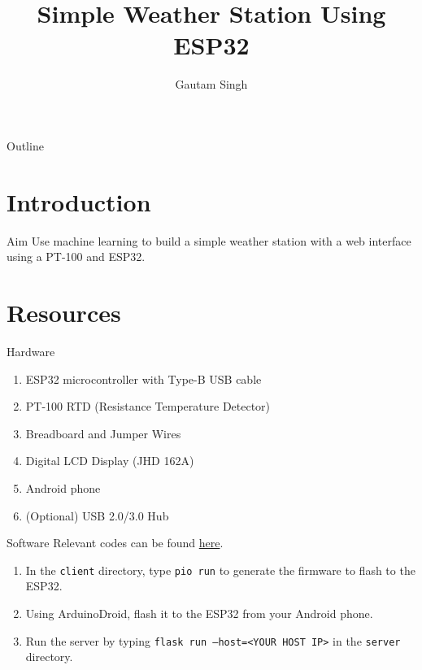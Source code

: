 \documentclass{beamer}
\title[ESP32 Weather Station]{Simple Weather Station Using ESP32}
\author{Gautam Singh}
\theoremstyle{remark}
\begin{document}
\begin{frame}
    \titlepage 
\end{frame}

\logo{}

\begin{frame}{Outline}
    \tableofcontents
\end{frame}

\section{Introduction}
\begin{frame}{Aim}
    Use machine learning to build a simple weather station with a web interface
    using a PT-100 and ESP32.
\end{frame}

\section{Resources}
\begin{frame}{Hardware}
    \begin{enumerate}
        \item ESP32 microcontroller with Type-B USB cable
        \item PT-100 RTD (Resistance Temperature Detector)
        \item Breadboard and Jumper Wires
        \item Digital LCD Display (JHD 162A)
        \item Android phone
        \item (Optional) USB 2.0/3.0 Hub
    \end{enumerate}
\end{frame}

\begin{frame}[label=software]{Software}
Relevant codes can be found 
\href{https://github.com/goats-9/ee2802-assignments/tree/main/pt100/esp32/codes}{here}.
\begin{enumerate}
    \item In the \texttt{client} directory, type \texttt{pio run} to generate the firmware to
    flash to the ESP32.
    \item Using ArduinoDroid, flash it to the ESP32 from your Android phone.
    \item Run the server by typing \texttt{flask run --host=<YOUR HOST IP>} in the \texttt{server} directory.
\end{enumerate}
\end{frame}
\end{document}
